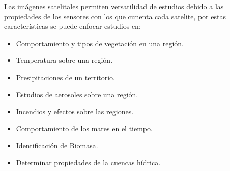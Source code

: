 Las imágenes satelitales permiten versatilidad de estudios debido a las propiedades de los sensores con los que cunenta cada satelite, por estas características se puede
enfocar estudios en:

\begin{itemize}
 \item Comportamiento y tipos de vegetación en una región.
 \item Temperatura sobre una región.
 \item Presipitaciones de un territorio.
 \item Estudios de aerosoles sobre una región.
 \item Incendios y efectos sobre las regiones.
 \item Comportamiento de los mares en el tiempo.
 \item Identificación de Biomasa.
 \item Determinar propiedades de la cuencas hídrica.
\end{itemize}


